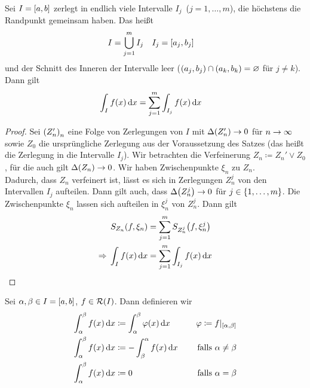 \begin{satz} %
    \label{satz:integral-zerlegt}
    Sei $I=\left[a, b\right]$ zerlegt in endlich viele Intervalle $I_j$~($j=1,\dots, m$), die höchstens die Randpunkt gemeinsam haben. Das heißt
    \begin{align*}
        I &= \bigcup_{j=1}^{m} I_j\quad I_j = \left[a_j, b_j\right]
    \end{align*}
    und der Schnitt des Inneren der Intervalle leer ($\left(a_j, b_j\right)\cap\left(a_k, b_k\right) = \varnothing$ für $j\neq k$). Dann gilt
    \begin{align*}
        \int_{I}^{} f\of{x} \dif x &= \sum_{j=1}^{m} \int_{I_j}^{} f\of{x} \dif x
    \end{align*}
    \begin{proof}
        Sei $\left(Z'_n\right)_n$ eine Folge von Zerlegungen von $I$ mit $\Delta\of{Z'_n}\fromto 0$ für $n\rightarrow{}\infty$ sowie $Z_0$ die ursprüngliche Zerlegung aus der Voraussetzung des Satzes (das heißt die Zerlegung in die Intervalle $I_j$). Wir betrachten die Verfeinerung $Z_n\coloneqq Z_n' \lor Z_0$, für die auch gilt $\Delta\of{Z_n}\fromto 0$. Wir haben Zwischenpunkte $\xi_n$ zu $Z_n$.\\
        Dadurch, dass $Z_n$ verfeinert ist, lässt es sich in Zerlegungen $Z_n^j$ von den Intervallen $I_j$ aufteilen. Dann gilt auch, dass $\Delta\of{Z_n^j}\fromto 0$ für $j\in\left\{1,\ldots, m\right\}$. Die Zwischenpunkte $\xi_n$ lassen sich aufteilen in $\xi_n^j$ von $Z_n^j$. Dann gilt
        \begin{align*}
            S_{Z_n}\of{f, \xi_n} &= \sum_{j=1}^{m} S_{Z_n^j}\of{f, \xi_n^j}\\
            \impl \int_{I}^{} f\of{x} \dif x &= \sum_{j=1}^{m} \int_{I_j}^{} f\of{x} \dif x\qedhere
        \end{align*}
    \end{proof}
\end{satz}

\begin{definition}
    Sei $\alpha, \beta\in I = \left[a,b\right]$, $f\in\mR\of{I}$. Dann definieren wir
    \begin{alignat*}{2}
        \int_{\alpha}^{\beta} f\of{x} \dif x&\coloneqq \int_{\alpha}^{\beta} \varphi\of{x}\dif x  &\quad \varphi \coloneqq f\vert_{\interv{\alpha, \beta}} \\
        \int_{\alpha}^{\beta} f\of{x} \dif x&\coloneqq -\int_{\beta}^{\alpha} f\of{x} \dif x &\quad\text{ falls } \alpha \neq \beta\\
        \int_{\alpha}^{\beta} f\of{x} \dif x&\coloneqq 0 &\quad\text{ falls } \alpha = \beta
    \end{alignat*}
\end{definition}

